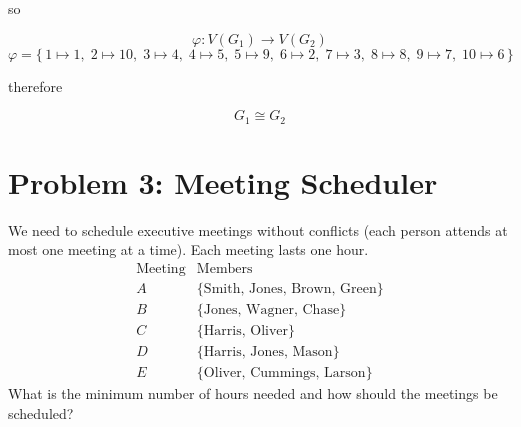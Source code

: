 \begin{center}
\end{center}

so 

\[
\varphi : V(G_1) \to V(G_2)
\]
\[
\varphi = \{\, 
1 \mapsto 1,\;
2 \mapsto 10,\;
3 \mapsto 4,\;
4 \mapsto 5,\;
5 \mapsto 9,\;
6 \mapsto 2,\;
7 \mapsto 3,\;
8 \mapsto 8,\;
9 \mapsto 7,\;
10 \mapsto 6
\,\}
\]

therefore

\[\boxed{G_1 \cong G_2}\]

\vspace{1em}
\hrulefill

\section*{Problem 3: Meeting Scheduler}
We need to schedule executive meetings without conflicts (each person attends at most one meeting at a time). Each meeting lasts one hour.
\[
\begin{array}{c|l}
\text{Meeting} & \text{Members} \\
\hline
A & \{ \text{Smith, Jones, Brown, Green} \} \\
B & \{ \text{Jones, Wagner, Chase} \} \\
C & \{ \text{Harris, Oliver} \} \\
D & \{ \text{Harris, Jones, Mason} \} \\
E & \{ \text{Oliver, Cummings, Larson} \}
\end{array}
\]
What is the minimum number of hours needed and how should the meetings be scheduled?

